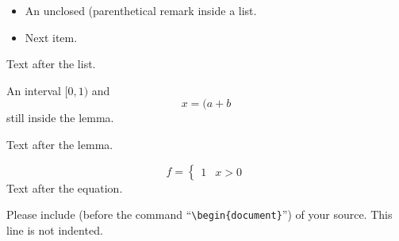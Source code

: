 \documentclass{article}
\begin{document}
\begin{itemize}
\item An unclosed (parenthetical
remark inside a list.
\item Next item.
\end{itemize}
Text after the list.

\begin{lemma}
An interval $[0,1)$ and
\begin{equation}
x = (a
+ b
\end{equation}
still inside the lemma.
\end{lemma}
Text after the lemma.

\begin{equation*}
f = \left\{
\begin{array}{ll}
1 & x > 0
\end{array}
\right.
\end{equation*}
Text after the equation.

Please include (before the
command ``\verb|\begin{document}|'') of your source.
This line is not indented.
\end{document}
